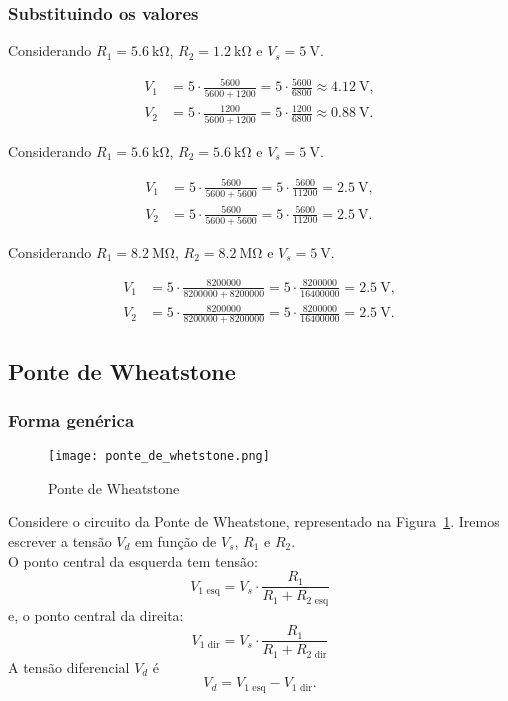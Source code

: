 \documentclass[a4paper, 12pt]{article}
\begin{document}
\subsubsection{Substituindo os valores}
Considerando $R_1 = \SI{5.6}{\kilo\ohm}$, $R_2 = \SI{1.2}{\kilo\ohm}$ e $V_s = \SI{5}{\volt}$.

\begin{align*}
V_1 &= 5 \cdot \frac{5600}{5600 + 1200} 
= 5 \cdot \frac{5600}{6800} 
\approx \SI{4,12}{\volt}, \\[6pt]
V_2 &= 5 \cdot \frac{1200}{5600 + 1200} 
= 5 \cdot \frac{1200}{6800} 
\approx \SI{0,88}{\volt}.
\end{align*}

Considerando $R_1 = \SI{5.6}{\kilo\ohm}$, $R_2 = \SI{5.6}{\kilo\ohm}$ e $V_s = \SI{5}{\volt}$.

\begin{align*}
V_1 &= 5 \cdot \frac{5600}{5600 + 5600} 
= 5 \cdot \frac{5600}{11200} 
= \SI{2,5}{\volt}, \\[6pt]
V_2 &= 5 \cdot \frac{5600}{5600 + 5600} 
= 5 \cdot \frac{5600}{11200} 
= \SI{2,5}{\volt}.
\end{align*}

Considerando $R_1 = \SI{8.2}{\mega\ohm}$, $R_2 = \SI{8.2}{\mega\ohm}$ e $V_s = \SI{5}{\volt}$.

\begin{align*}
V_1 &= 5 \cdot \frac{8200000}{8200000 + 8200000} 
= 5 \cdot \frac{8200000}{16400000} 
= \SI{2,5}{\volt}, \\[6pt]
V_2 &= 5 \cdot \frac{8200000}{8200000 + 8200000} 
= 5 \cdot \frac{8200000}{16400000} 
= \SI{2,5}{\volt}.
\end{align*}

\subsection{Ponte de Wheatstone}
\subsubsection{Forma genérica}

\begin{figure}[H]
\centering
\texttt{[image: ponte\_de\_whetstone.png]}
\caption{Ponte de Wheatstone}
\label{fig:ponte_de_wheatstone}
\end{figure}

Considere o circuito da Ponte de Wheatstone, representado na Figura~\ref{fig:ponte_de_wheatstone}. Iremos escrever a tensão $V_d$ em função de $V_s$, $R_1$ e $R_2$.
\\
O ponto central da esquerda tem tensão:
\[
V_{1\text{ esq}} = V_s \cdot \frac{R_1}{R_1 + R_{2\text{ esq}}}
\]
e, o ponto central da direita:
\[
V_{1\text{ dir}} = V_s \cdot \frac{R_1}{R_1 + R_{2\text{ dir}}}
\]
A tensão diferencial $V_d$ é
\[
V_d = V_{1\text{ esq}} - V_{1\text{ dir}}.
\]
\end{document}

